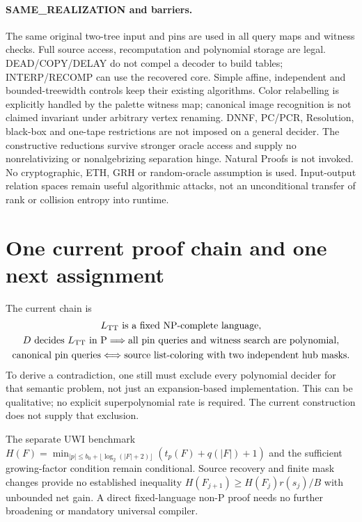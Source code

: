 \documentclass[11pt]{article}
\begin{document}
\paragraph{SAME\_REALIZATION and barriers.}
The same original two-tree input and pins are used in all query maps and
witness checks. Full source access, recomputation and polynomial storage are
legal. DEAD/COPY/DELAY do not compel a decoder to build tables; INTERP/RECOMP
can use the recovered core. Simple affine, independent and bounded-treewidth
controls keep their existing algorithms. Color relabelling is explicitly
handled by the palette witness map; canonical image recognition is not
claimed invariant under arbitrary vertex renaming. DNNF, PC/PCR, Resolution,
black-box and one-tape restrictions are not imposed on a general decider.
The constructive reductions survive stronger oracle access and supply no
nonrelativizing or nonalgebrizing separation hinge. Natural Proofs is not
invoked. No cryptographic, ETH, GRH or random-oracle assumption is used.
Input-output relation spaces remain useful algorithmic attacks, not an
unconditional transfer of rank or collision entropy into runtime.

\section{One current proof chain and one next assignment}
The current chain is
\[
 \begin{gathered}
 L_{\rm TT}\text{ is a fixed NP-complete language},\\
 D\text{ decides }L_{\rm TT}\text{ in P}
 \Longrightarrow\text{all pin queries and witness search are polynomial},\\
 \text{canonical pin queries}\Longleftrightarrow
       \text{source list-coloring with two independent hub masks}.
 \end{gathered}
\]
To derive a contradiction, one still must exclude every polynomial decider
for that semantic problem, not just an expansion-based implementation. This
can be qualitative; no explicit superpolynomial rate is required. The current
construction does not supply that exclusion.

The separate UWI benchmark
$H(F)=\min_{|p|\le b_0+\lfloor\log_2(|F|+2)\rfloor}(t_p(F)+q(|F|)+1)$
and the sufficient growing-factor condition remain conditional. Source
recovery and finite mask changes provide no established inequality
$H(F_{j+1})\ge H(F_j)r(s_j)/B$ with unbounded net gain. A direct fixed-language
non-P proof needs no further broadening or mandatory universal compiler.
\end{document}
